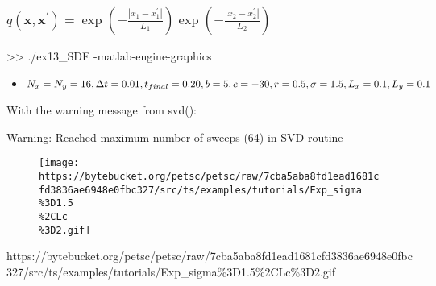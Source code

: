 \documentclass[
]{article}
\newenvironment{Shaded}{}{}
\newcommand{\NormalTok}[1]{#1}
\begin{document}
\hypertarget{header-n439}{%
\subsubsection{\texorpdfstring{\(q(\mathbf{x},\mathbf{x}^{\prime})=\exp\left(-\frac{|x_1-x^{\prime}_1|}{L_1}\right) \exp\left(-\frac{|x_2-x^{\prime}_2|}{L_2}\right)\)}{q(\textbackslash mathbf\{x\},\textbackslash mathbf\{x\}\^{}\{\textbackslash prime\})=\textbackslash exp\textbackslash left(-\textbackslash frac\{\textbar x\_1-x\^{}\{\textbackslash prime\}\_1\textbar\}\{L\_1\}\textbackslash right) \textbackslash exp\textbackslash left(-\textbackslash frac\{\textbar x\_2-x\^{}\{\textbackslash prime\}\_2\textbar\}\{L\_2\}\textbackslash right)}}\label{header-n439}}

\begin{Shaded}
\begin{Highlighting}[]
\NormalTok{>> ./ex13_SDE -matlab-engine-graphics}
\end{Highlighting}
\end{Shaded}

\begin{itemize}
\item
  \(N_x=N_y=16, \Delta t=0.01, t_{final}=0.20,\\b=5,c=-30,r=0.5,\\\sigma=1.5,L_{x}=0.1,L_{y}=0.1\)
\end{itemize}

With the warning message from svd():

Warning: Reached maximum number of sweeps (64) in SVD routine

\begin{figure}
\centering
\texttt{[image: https://bytebucket.org/petsc/petsc/raw/7cba5aba8fd1ead1681cfd3836ae6948e0fbc327/src/ts/examples/tutorials/Exp\_sigma\\\%3D1.5\\\%2CLc\\\%3D2.gif]}
\caption{}
\end{figure}

https://bytebucket.org/petsc/petsc/raw/7cba5aba8fd1ead1681cfd3836ae6948e0fbc327/src/ts/examples/tutorials/Exp\_sigma\%3D1.5\%2CLc\%3D2.gif
\end{document}
